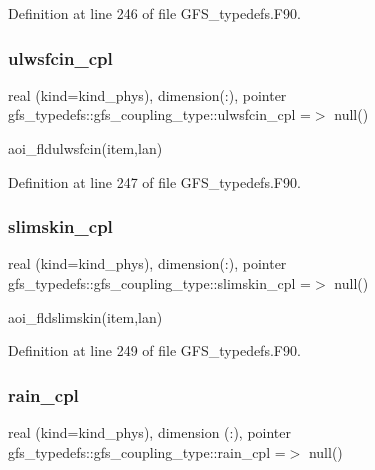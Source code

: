 Definition at line 246 of file G\+F\+S\+\_\+typedefs.\+F90.

\mbox{\label{structgfs__typedefs_1_1gfs__coupling__type_a76ba854a9d1d3c720486cd8fcf8fb6cf}} 
\subsubsection{ulwsfcin\+\_\+cpl}
{\footnotesize\ttfamily real (kind=kind\+\_\+phys), dimension(\+:), pointer gfs\+\_\+typedefs\+::gfs\+\_\+coupling\+\_\+type\+::ulwsfcin\+\_\+cpl =$>$ null()}



aoi\+\_\+fldulwsfcin(item,lan) 



Definition at line 247 of file G\+F\+S\+\_\+typedefs.\+F90.

\mbox{\label{structgfs__typedefs_1_1gfs__coupling__type_aa958347a656d4e9b57a84900fb4ae31b}} 
\subsubsection{slimskin\+\_\+cpl}
{\footnotesize\ttfamily real (kind=kind\+\_\+phys), dimension(\+:), pointer gfs\+\_\+typedefs\+::gfs\+\_\+coupling\+\_\+type\+::slimskin\+\_\+cpl =$>$ null()}



aoi\+\_\+fldslimskin(item,lan) 



Definition at line 249 of file G\+F\+S\+\_\+typedefs.\+F90.

\mbox{\label{structgfs__typedefs_1_1gfs__coupling__type_acc1d008d2c9b3aef5eb207f5ec7d6976}} 
\subsubsection{rain\+\_\+cpl}
{\footnotesize\ttfamily real (kind=kind\+\_\+phys), dimension  (\+:), pointer gfs\+\_\+typedefs\+::gfs\+\_\+coupling\+\_\+type\+::rain\+\_\+cpl =$>$ null()}



